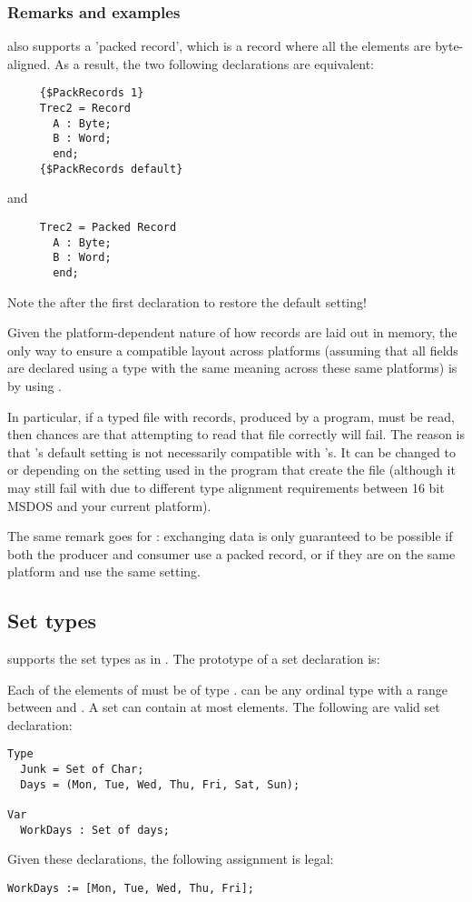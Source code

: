\subsubsection{Remarks and examples}

\fpc also supports a 'packed record', which is a record where all the
elements are byte-aligned. As a result, the two following declarations
are equivalent:
\begin{verbatim}
     {$PackRecords 1}
     Trec2 = Record
       A : Byte;
       B : Word;
       end;
     {$PackRecords default}
\end{verbatim}
and
\begin{verbatim}
     Trec2 = Packed Record
       A : Byte;
       B : Word;
       end;
\end{verbatim}
Note the  after the first declaration to
restore the default setting!

Given the platform-dependent nature of how records are laid out in
memory, the only way to ensure a compatible layout across platforms
(assuming that all fields are declared using a type with the same
meaning across these same platforms) is by using .

In particular, if a typed file with records, produced by a \tp program,
must be read, then chances are that attempting to read that file
correctly will fail. The reason is that \fpc{}'s default
 setting is not necessarily compatible with
\tp{}'s. It can be changed to  or
 depending on the setting used in the \tp
program that create the file (although it may still fail with
 due to different type alignment requirements
between 16 bit MSDOS and your current platform).

The same remark goes for \delphi{}: exchanging data is only guaranteed
to be possible if both the producer and consumer use a packed record, or
if they are on the same platform and use the same  setting.


%
\subsection{Set types}
\fpc supports the set types as in \tp. The prototype of a set
declaration is:

Each of the elements of  must be of type .
 can be any ordinal type with a range between  and
. A set can contain at most  elements.
The following are valid set declaration:
\begin{verbatim}
Type
  Junk = Set of Char;
  Days = (Mon, Tue, Wed, Thu, Fri, Sat, Sun);

Var
  WorkDays : Set of days;
\end{verbatim}
Given these declarations, the following assignment is legal:
\begin{verbatim}
WorkDays := [Mon, Tue, Wed, Thu, Fri];
\end{verbatim}

